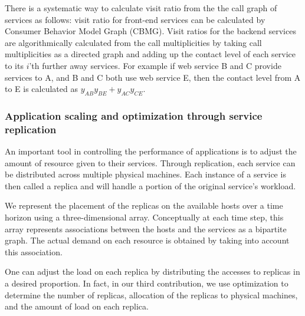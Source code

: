 \documentclass[11pt]{article}
\begin{document}
	There is a systematic way to calculate visit ratio from the the call graph of services as follows: visit ratio for front-end services can be calculated by Consumer Behavior Model Graph (CBMG). Visit ratios for the backend services are algorithmically calculated from the call multiplicities by taking call multiplicities as a directed graph and adding up the contact level of each service to its $i$'th further away services. For example if web service  B and C provide services to A, and  B and C both use web service E, then the contact level from A to E  is calculated as $y_{AB}y_{BE}+y_{AC}y_{CE}$.

	 \subsubsection{Application scaling and optimization through service replication} 
	An important tool in controlling the performance of applications is to adjust the amount of resource given to their services.
	Through replication, each service can be distributed across multiple physical machines. Each instance of a service is then called a replica and will handle a portion of the original service's workload.  
	
	We represent the placement of the replicas on the available hosts over a time horizon using a three-dimensional array. Conceptually at each time step, this array represents associations between the hosts and the services as a bipartite graph. The actual demand on each resource is obtained by taking into account this association.
	
 One can adjust the load on each replica by distributing the accesses to replicas in a desired proportion.
In fact, in our third contribution, we use optimization to determine the number of replicas, allocation of the replicas to physical machines, and the amount of load on each replica. 
 
\end{document}
